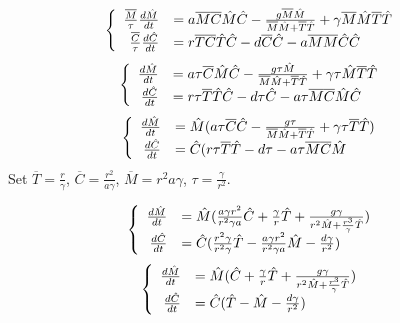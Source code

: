 {\center
\begin{frame}$$\begin{cases}
\begin{array}{rl}
\frac{\overline{M}}{\tau}\frac{d\HAT{M}}{dt}&= a\overline{M}\overline{C}\HAT{M}\HAT{C}-\frac{g\overline{M}\HAT{M}}{\overline{M}\HAT{M}+\overline{T}\HAT{T}} + \gamma \overline{M}\HAT{M}\overline{T}\HAT{T}\\ 
\frac{\overline{C}}{\tau}\frac{d\HAT{C}}{dt}&=r\overline{T}\overline{C}\HAT{T}\HAT{C}-d\overline{C}\HAT{C}-a\overline{M}\overline{M}\HAT{C}\HAT{C}
\end{array} \end{cases}$$$$\begin{cases}
\begin{array}{rl}
\frac{d\HAT{M}}{dt}&= a\tau\overline{C}\HAT{M}\HAT{C}-\frac{g\tau\HAT{M}}{\overline{M}\HAT{M}+\overline{T}\HAT{T}} + \gamma \tau\HAT{M}\overline{T}\HAT{T}\\ 
\frac{d\HAT{C}}{dt}&=r\tau\overline{T}\HAT{T}\HAT{C}-d\tau\HAT{C}-a\tau\overline{M}\overline{C}\HAT{M}\HAT{C}
\end{array} \end{cases}$$$$\begin{cases}
\begin{array}{rl}
\frac{d\HAT{M}}{dt}&= \HAT{M}(a\tau\overline{C}\HAT{C}-\frac{g\tau}{\overline{M}\HAT{M}+\overline{T}\HAT{T}} + \gamma \tau\overline{T}\HAT{T})\\ 
\frac{d\HAT{C}}{dt}&=\HAT{C}(r\tau\overline{T}\HAT{T}-d\tau-a\tau\overline{M}\overline{C}\HAT{M}
\end{array} \end{cases}$$ Set $\overline{T}=\frac{r}{\gamma}$, $\overline{C}=\frac{r^2}{a\gamma}$, $\overline{M}={r^2}{a\gamma}$, $\tau=\frac{\gamma}{r^2}$.
\end{frame}
}
\begin{frame}$$\begin{cases}
\begin{array}{rl}
\frac{d\HAT{M}}{dt}&= \HAT{M}(\frac{a\gamma r^2}{r^2\gamma a}\HAT{C}+\frac{\gamma}{r}\HAT{T}+\frac{g\gamma}{r^2\HAT{M}+ \frac{r^3}{\gamma}\HAT{T}}) \\ 
\frac{d\HAT{C}}{dt}&=\HAT{C}(\frac{r^2\gamma}{r^2\gamma}\HAT{T}-\frac{a\gamma r^2}{r^2\gamma a}\HAT{M}-\frac{d\gamma}{r^2})
\end{array} \end{cases}$$$$\begin{cases}
\begin{array}{rl}
\frac{d\HAT{M}}{dt}&= \HAT{M}(\HAT{C}+\frac{\gamma}{r}\HAT{T}+\frac{g\gamma}{r^2\HAT{M}+ \frac{r^3}{\gamma}\HAT{T}}) \\ 
\frac{d\HAT{C}}{dt}&=\HAT{C}(\HAT{T}-\HAT{M}-\frac{d\gamma}{r^2})
\end{array} \end{cases}$$
\end{frame}

